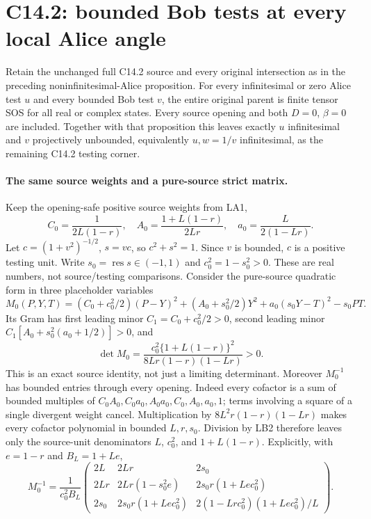\section{C14.2: bounded Bob tests at every local Alice angle}
\label{sec:r18-c142-bounded-bob}

\begin{proposition}
Retain the unchanged full C14.2 source and every original intersection
as in the preceding noninfinitesimal-Alice proposition.  For every
infinitesimal or zero Alice test $u$ and every bounded Bob test $v$,
the entire original parent is finite tensor SOS for all real or
complex states.  Every source opening and both $D=0$, $\beta=0$
are included.  Together with that proposition this leaves exactly
$u$ infinitesimal and $v$ projectively unbounded, equivalently
$u,w=1/v$ infinitesimal, as the remaining C14.2 testing corner.
\end{proposition}

\paragraph{The same source weights and a pure-source strict matrix.}
Keep the opening-safe positive source weights from LA1,
\[
 C_0=\frac1{2L(1-r)},\quad
 A_0=\frac{1+L(1-r)}{2Lr},\quad
 a_0=\frac L{2(1-Lr)}.
\]
Let $c=(1+v^2)^{-1/2}$, $s=vc$, so $c^2+s^2=1$.
Since $v$ is bounded, $c$ is a positive testing unit.  Write
$s_0=\operatorname{res}s\in(-1,1)$ and $c_0^2=1-s_0^2>0$.
These are real numbers, not source/testing comparisons.  Consider
the pure-source quadratic form in three placeholder variables
\[
 M_0(P,Y,T)=
  (C_0+c_0^2/2)(P-Y)^2+(A_0+s_0^2/2)Y^2
          +a_0(s_0Y-T)^2-s_0PT.                    \tag{LB1}
\]
Its Gram has first leading minor $C_1=C_0+c_0^2/2>0$,
second leading minor $C_1[A_0+s_0^2(a_0+1/2)]>0$, and
\[
 \det M_0=
 \frac{c_0^2\{1+L(1-r)\}^2}
                {8Lr(1-r)(1-Lr)}>0.               \tag{LB2}
\]
This is an exact source identity, not just a limiting determinant.
Moreover $M_0^{-1}$ has bounded entries through every opening.
Indeed every cofactor is a sum of bounded multiples of
$C_0A_0,C_0a_0,A_0a_0,C_0,A_0,a_0,1$; terms involving a square
of a single divergent weight cancel.  Multiplication by
$8L^2r(1-r)(1-Lr)$ makes every cofactor polynomial in bounded
$L,r,s_0$.  Division by LB2 therefore leaves only the source-unit
denominators $L$, $c_0^2$, and $1+L(1-r)$.
Explicitly, with $e=1-r$ and $B_L=1+Le$,
\[
 M_0^{-1}=\frac1{c_0^2B_L}
 \begin{pmatrix}
 2L&2Lr&2s_0\\
 2Lr&2Lr(1-s_0^2e)&2s_0r(1+Le c_0^2)\\
 2s_0&2s_0r(1+Le c_0^2)&
       2(1-Lr c_0^2)(1+Le c_0^2)/L
 \end{pmatrix}.                                      \tag{LB2a}
\]

